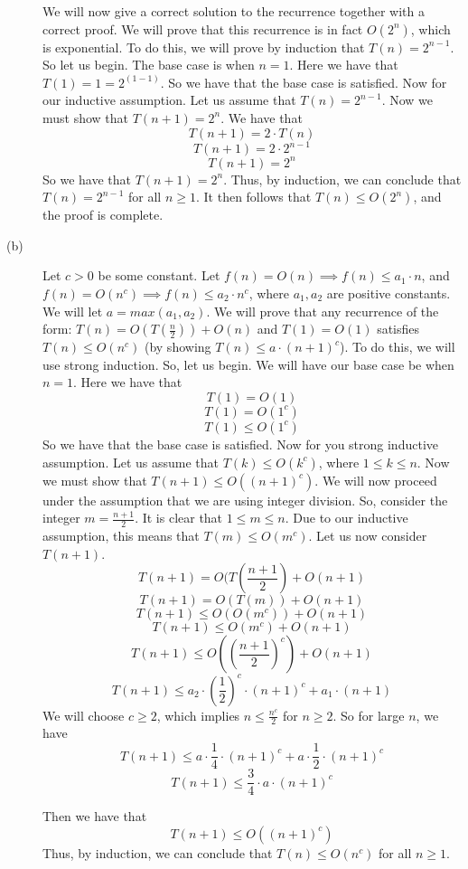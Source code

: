 \documentclass{article}
\begin{document}
\begin{description}
        We will now give a correct solution to the recurrence together with a
        correct proof. We will prove that this recurrence is in fact $O(2^n)$,
        which is exponential. To do this, we will prove by induction
        that $T(n) = 2^{n-1}$. So let us
        begin. The base case is when $n = 1$. Here we have that $T(1) = 1 =
        2^{(1-1)}$. So we have that the base case is satisfied. Now for our
        inductive assumption. Let us assume that $T(n) = 2^{n-1}$. Now we must
        show that $T(n+1) = 2^{n}$. We have that
        \[ T(n+1) = 2 \cdot T(n) \]
        \[ T(n+1) = 2 \cdot 2^{n-1} \]
        \[ T(n+1) = 2^n \]
        So we have that $T(n+1) = 2^n$. Thus, by induction, we can conclude that
        $T(n) = 2^{n-1}$ for all $n \geq 1$. It then follows that
        $T(n) \leq O(2^n)$, and the proof is complete.
    \item[(b)]
        Let $c > 0$ be some constant. Let $f(n) = O(n) \implies f(n) \leq a_1
        \cdot n$, and $f(n) = O(n^c) \implies f(n) \leq a_2 \cdot n^c$, where
        $a_1, a_2$ are positive constants. We will let $a = max(a_1, a_2)$.
        We will prove that any recurrence of the form: $T(n) = O(T(\frac{n}{2})) + O(n)$
        and $T(1) = O(1)$ satisfies $T(n) \leq O(n^c)$ (by showing
        $T(n) \leq a \cdot (n+1)^c$). To do this, we will
        use strong induction. So, let us begin. We will have our
        base case be when $n = 1$.  Here we have that
        \[ T(1) = O(1) \]
        \[ T(1) = O(1^c) \]
        \[ T(1) \leq O(1^c) \]
        So we have that the base case is satisfied. Now for you strong inductive
        assumption. Let us assume that $T(k) \leq O(k^c)$, where $1 \leq k
        \leq n$. Now we must show that $T(n+1) \leq O((n+1)^{c})$. We will
        now proceed under the assumption that we are using integer division.
        So, consider the integer $m = \frac{n+1}{2}$. It is clear that $1 \leq m \leq
        n$. Due to our inductive assumption, this means that $T(m) \leq O(m^c)$.
        Let us now consider $T(n+1)$.
        \[ T(n+1) = O(T(\frac{n+1}{2}) + O(n+1) \]
        \[ T(n+1) = O(T(m)) + O(n+1) \]
        \[ T(n+1) \leq O(O(m^c)) + O(n+1) \]
        \[ T(n+1) \leq O(m^c) + O(n+1) \]
        \[ T(n+1) \leq O((\frac{n+1}{2})^c) + O(n+1) \]
        \[ T(n+1) \leq a_2 \cdot (\frac{1}{2})^c \cdot (n+1)^c +
        a_1 \cdot (n+1) \]
        We will choose $c \ge 2$, which implies $n \le
        \frac{n^c}{2}$ for $n \ge 2$. So for large $n$, we have
        \[ T(n+1) \leq a \cdot \frac{1}{4} \cdot (n+1)^c + a \cdot
        \frac{1}{2} \cdot (n+1)^c \]
        \[ T(n+1) \leq \frac{3}{4} \cdot a \cdot (n+1)^c \]

        Then we have that
        \[ T(n+1) \leq  O((n+1)^c) \]
        Thus, by induction, we can conclude that $T(n) \leq O(n^c)$ for all
        $n \ge 1$.
\end{description}
\newpage
\end{document}
